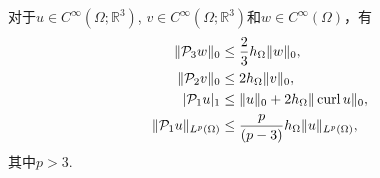\begin{lemma}
对于$u\in C^{\infty}(\Omega;\mathbb R^3)$, $v\in C^{\infty}(\Omega;\mathbb R^3)$和$w\in C^{\infty}(\Omega)$，有
\begin{align}
\label{poincareP3bound}
\|\mathcal{P}_3w\|_0&\leq \frac{2}{3}h_{\Omega}\|w\|_0, \\
\label{poincareP2bound}
\|\mathcal{P}_2v\|_0&\leq 2h_{\Omega}\|v\|_0, \\
\label{poincareP1bound}
|\mathcal{P}_1u|_{1}&\leq \|u\|_0+2h_{\Omega}\|\operatorname{curl} u\|_0, \\
\label{poincareP1boundLp}
\|\mathcal{P}_1u\|_{L^p(\Omega)}&\leq \frac{p}{(p-3)}h_{\Omega}\|u\|_{L^p(\Omega)},
\end{align}
其中$p>3$.
\end{lemma}
